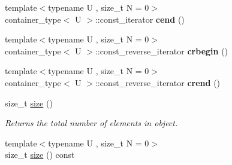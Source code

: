 \begin{DoxyCompactItemize}
\item 
\hypertarget{classheterogeneous_1_1heterodeque_3_01_t_00_01_types_8_8_8_4_a9ff4a54d5ac69082474fb78656be57db}{}{\footnotesize template$<$typename U , size\+\_\+t N = 0$>$ }\\container\+\_\+type$<$ U $>$\+::const\+\_\+iterator {\bfseries cend} ()\label{classheterogeneous_1_1heterodeque_3_01_t_00_01_types_8_8_8_4_a9ff4a54d5ac69082474fb78656be57db}

\item 
\hypertarget{classheterogeneous_1_1heterodeque_3_01_t_00_01_types_8_8_8_4_aa755c98996e4c7f7b22bb97c2159b095}{}{\footnotesize template$<$typename U , size\+\_\+t N = 0$>$ }\\container\+\_\+type$<$ U $>$\+::const\+\_\+reverse\+\_\+iterator {\bfseries crbegin} ()\label{classheterogeneous_1_1heterodeque_3_01_t_00_01_types_8_8_8_4_aa755c98996e4c7f7b22bb97c2159b095}

\item 
\hypertarget{classheterogeneous_1_1heterodeque_3_01_t_00_01_types_8_8_8_4_a1c4159a8e94c5fb239c80d780acbe724}{}{\footnotesize template$<$typename U , size\+\_\+t N = 0$>$ }\\container\+\_\+type$<$ U $>$\+::const\+\_\+reverse\+\_\+iterator {\bfseries crend} ()\label{classheterogeneous_1_1heterodeque_3_01_t_00_01_types_8_8_8_4_a1c4159a8e94c5fb239c80d780acbe724}

\item 
\hypertarget{classheterogeneous_1_1heterodeque_3_01_t_00_01_types_8_8_8_4_a4f670a08b7d81e671c112bf762ddc29b}{}size\+\_\+t \hyperlink{classheterogeneous_1_1heterodeque_3_01_t_00_01_types_8_8_8_4_a4f670a08b7d81e671c112bf762ddc29b}{size} ()\label{classheterogeneous_1_1heterodeque_3_01_t_00_01_types_8_8_8_4_a4f670a08b7d81e671c112bf762ddc29b}

\begin{DoxyCompactList}\small\item\em Returns the total number of elements in object. \end{DoxyCompactList}\item 
\hypertarget{classheterogeneous_1_1heterodeque_3_01_t_00_01_types_8_8_8_4_a8894904e8624116a13c0abfc073f4dfa}{}{\footnotesize template$<$typename U , size\+\_\+t N = 0$>$ }\\size\+\_\+t \hyperlink{classheterogeneous_1_1heterodeque_3_01_t_00_01_types_8_8_8_4_a8894904e8624116a13c0abfc073f4dfa}{size} () const \label{classheterogeneous_1_1heterodeque_3_01_t_00_01_types_8_8_8_4_a8894904e8624116a13c0abfc073f4dfa}


\end{DoxyCompactItemize}
